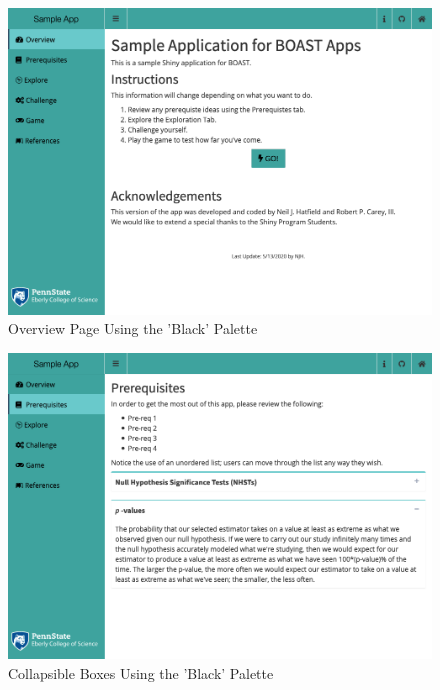 \documentclass[]{book}
\begin{document}
\begin{figure}

{\centering \includegraphics[width=14in]{images/blackOverview} 

}

\caption{Overview Page Using the 'Black' Palette}\label{fig:blackAction1}
\end{figure}

\begin{figure}

{\centering \includegraphics[width=14in]{images/blackCollapse} 

}

\caption{Collapsible Boxes Using the 'Black' Palette}\label{fig:blackAction2}
\end{figure}
\end{document}
